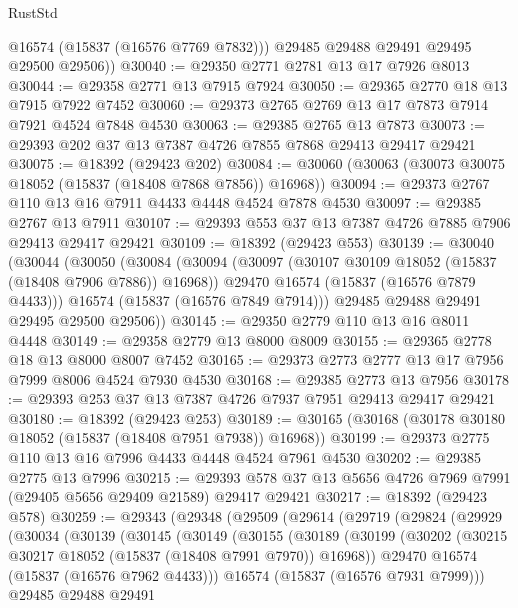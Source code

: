 \begin{lexlean}{RustStd}
\begin{coremodule}
          @16574
          (@15837 (@16576 @7769 @7832)))
        @29485
        @29488
        @29491
        @29495
        @29500
        @29506))
@30040 := @29350 @2771 @2781 @13 @17 @7926 @8013
@30044 := @29358 @2771 @13 @7915 @7924
@30050 := @29365 @2770 @18 @13 @7915 @7922 @7452
@30060 := @29373 @2765 @2769 @13 @17 @7873 @7914 @7921 @4524 @7848 @4530
@30063 := @29385 @2765 @13 @7873
@30073 := @29393 @202 @37 @13 @7387 @4726 @7855 @7868 @29413 @29417 @29421
@30075 := @18392 (@29423 @202)
@30084 := @30060 (@30063 (@30073 @30075 @18052 (@15837 (@18408 @7868 @7856)) @16968))
@30094 := @29373 @2767 @110 @13 @16 @7911 @4433 @4448 @4524 @7878 @4530
@30097 := @29385 @2767 @13 @7911
@30107 := @29393 @553 @37 @13 @7387 @4726 @7885 @7906 @29413 @29417 @29421
@30109 := @18392 (@29423 @553)
@30139 := @30040
    (@30044
      (@30050
        (@30084
          (@30094
            (@30097 (@30107 @30109 @18052 (@15837 (@18408 @7906 @7886)) @16968))
            @29470
            @16574
            (@15837 (@16576 @7879 @4433)))
          @16574
          (@15837 (@16576 @7849 @7914)))
        @29485
        @29488
        @29491
        @29495
        @29500
        @29506))
@30145 := @29350 @2779 @110 @13 @16 @8011 @4448
@30149 := @29358 @2779 @13 @8000 @8009
@30155 := @29365 @2778 @18 @13 @8000 @8007 @7452
@30165 := @29373 @2773 @2777 @13 @17 @7956 @7999 @8006 @4524 @7930 @4530
@30168 := @29385 @2773 @13 @7956
@30178 := @29393 @253 @37 @13 @7387 @4726 @7937 @7951 @29413 @29417 @29421
@30180 := @18392 (@29423 @253)
@30189 := @30165 (@30168 (@30178 @30180 @18052 (@15837 (@18408 @7951 @7938)) @16968))
@30199 := @29373 @2775 @110 @13 @16 @7996 @4433 @4448 @4524 @7961 @4530
@30202 := @29385 @2775 @13 @7996
@30215 := @29393 @578 @37 @13 @5656 @4726 @7969 @7991 (@29405 @5656 @29409 @21589) @29417 @29421
@30217 := @18392 (@29423 @578)
@30259 := @29343
    (@29348
      (@29509
        (@29614
          (@29719
            (@29824
              (@29929
                (@30034
                  (@30139
                    (@30145
                      (@30149
                        (@30155
                          (@30189
                            (@30199
                              (@30202 (@30215 @30217 @18052 (@15837 (@18408 @7991 @7970)) @16968))
                              @29470
                              @16574
                              (@15837 (@16576 @7962 @4433)))
                            @16574
                            (@15837 (@16576 @7931 @7999)))
                          @29485
                          @29488
                          @29491

\end{coremodule}
\end{lexlean}
